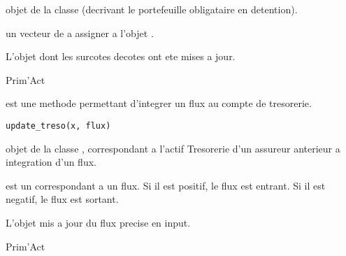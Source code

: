 \documentclass[a4paper]{book}
\begin{document}
%
\begin{Arguments}
\begin{ldescription}
\item[\code{x}] objet de la classe  (decrivant le portefeuille obligataire en detention).

\item[\code{sd}] un vecteur de  a assigner a l'objet .
\end{ldescription}
\end{Arguments}
%
\begin{Value}
L'objet  dont les surcotes decotes ont ete mises a jour.
\end{Value}
%
\begin{Author}\relax
Prim'Act
\end{Author}
%
\begin{Description}\relax
{} est une methode permettant d'integrer un flux au compte de tresorerie.
\end{Description}
%
\begin{Usage}
\begin{verbatim}
update_treso(x, flux)
\end{verbatim}
\end{Usage}
%
\begin{Arguments}
\begin{ldescription}
\item[\code{x}] objet de la classe , correspondant a l'actif Tresorerie d'un assureur anterieur a integration d'un flux.

\item[\code{flux}] est un  correspondant a un flux.
Si il est positif, le flux est entrant.
Si il est negatif, le flux est sortant.
\end{ldescription}
\end{Arguments}
%
\begin{Value}
L'objet  mis a jour du flux precise en input.
\end{Value}
%
\begin{Author}\relax
Prim'Act
\end{Author}
\end{document}
